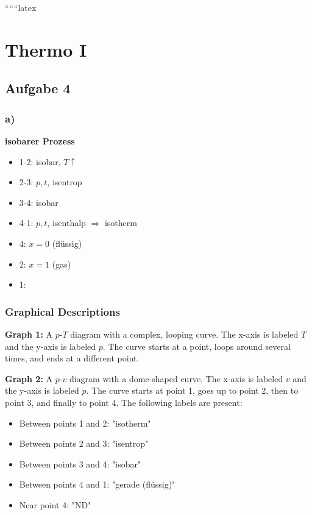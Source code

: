 
``````latex


\section*{Thermo I}
\subsection*{Aufgabe 4}

\subsubsection*{a)}
\textbf{isobarer Prozess}

\begin{itemize}
    \item 1-2: isobar, $T \uparrow$
    \item 2-3: $p,t$, isentrop
    \item 3-4: isobar
    \item 4-1: $p,t$, isenthalp $\Rightarrow$ isotherm
\end{itemize}

\begin{itemize}
    \item 4: $x=0$ (flüssig)
    \item 2: $x=1$ (gas)
    \item 1:
\end{itemize}

\subsubsection*{Graphical Descriptions}

\textbf{Graph 1:} A $p$-$T$ diagram with a complex, looping curve. The x-axis is labeled $T$ and the y-axis is labeled $p$. The curve starts at a point, loops around several times, and ends at a different point.

\textbf{Graph 2:} A $p$-$v$ diagram with a dome-shaped curve. The x-axis is labeled $v$ and the y-axis is labeled $p$. The curve starts at point 1, goes up to point 2, then to point 3, and finally to point 4. The following labels are present:
\begin{itemize}
    \item Between points 1 and 2: "isotherm"
    \item Between points 2 and 3: "isentrop"
    \item Between points 3 and 4: "isobar"
    \item Between points 4 and 1: "gerade (flüssig)"
    \item Near point 4: "ND"
\end{itemize}

